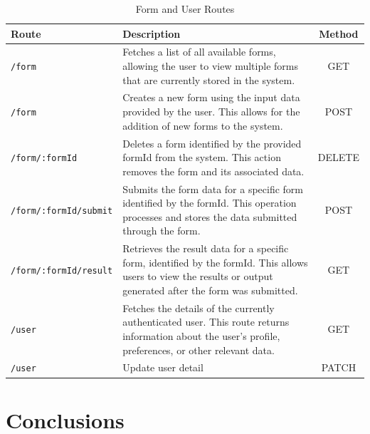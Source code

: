 \documentclass[12pt,oneside,openright,a4paper]{cpe-english-project}
\begin{document}
\begin{table}[h]
\centering
\caption{Form and User Routes}
\begin{tabular}{|l|p{9cm}|c|}
\hline
\textbf{Route} & \textbf{Description} & \textbf{Method} \\
\hline
\texttt{/form} & Fetches a list of all available forms, allowing the user to view multiple forms that are currently stored in the system. & GET \\
\hline
\texttt{/form} & Creates a new form using the input data provided by the user. This allows for the addition of new forms to the system. & POST \\
\hline
\texttt{/form/:formId} & Deletes a form identified by the provided formId from the system. This action removes the form and its associated data. & DELETE \\
\hline
\texttt{/form/:formId/submit} & Submits the form data for a specific form identified by the formId. This operation processes and stores the data submitted through the form. & POST \\
\hline
\texttt{/form/:formId/result} & Retrieves the result data for a specific form, identified by the formId. This allows users to view the results or output generated after the form was submitted. & GET \\
\hline
\texttt{/user} & Fetches the details of the currently authenticated user. This route returns information about the user's profile, preferences, or other relevant data. & GET \\
\hline
\texttt{/user} & Update user detail & PATCH \\
\hline
\end{tabular}
\label{tab:form_user_routes}
\end{table}



\chapter{Conclusions}


\end{document}
